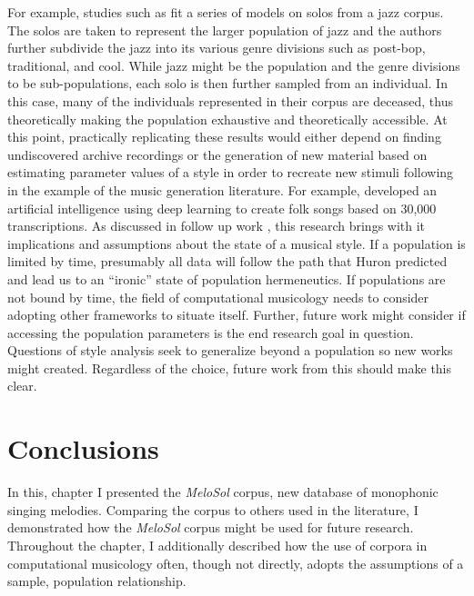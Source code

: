 \documentclass[12pt,]{book}
\begin{document}
For example, studies such as \citet{frielerTellingStoryDramaturgy2016} fit a series of models on solos from a jazz corpus.
The solos are taken to represent the larger population of jazz and the authors further subdivide the jazz into its various genre divisions such as post-bop, traditional, and cool.
While jazz might be the population and the genre divisions to be sub-populations, each solo is then further sampled from an individual.
In this case, many of the individuals represented in their corpus are deceased, thus theoretically making the population exhaustive and theoretically accessible.
At this point, practically replicating these results would either depend on finding undiscovered archive recordings or the generation of new material based on estimating parameter values of a style in order to recreate new stimuli following in the example of the music generation literature.
For example, \citet{sturmTakingModelsBack2017} developed an artificial intelligence using deep learning to create folk songs based on 30,000 transcriptions.
As discussed in follow up work \citep{sturmMachineLearningResearch2019}, this research brings with it implications and assumptions about the state of a musical style.
If a population is limited by time, presumably all data will follow the path that Huron predicted and lead us to an ``ironic'' state of population hermeneutics.
If populations are not bound by time, the field of computational musicology needs to consider adopting other frameworks to situate itself.
Further, future work might consider if accessing the population parameters is the end research goal in question.
Questions of style analysis seek to generalize beyond a population so new works might created.
Regardless of the choice, future work from this should make this clear.

\hypertarget{conclusions-2}{%
\section{Conclusions}\label{conclusions-2}}

In this, chapter I presented the \emph{MeloSol} corpus, new database of monophonic singing melodies.
Comparing the corpus to others used in the literature, I demonstrated how the \emph{MeloSol} corpus might be used for future research.
Throughout the chapter, I additionally described how the use of corpora in computational musicology often, though not directly, adopts the assumptions of a sample, population relationship.

\clearpage
\end{document}
